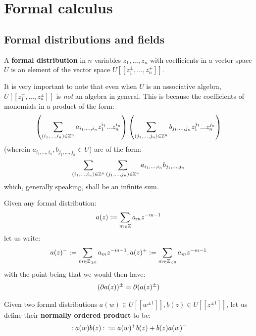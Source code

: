 \section{Formal calculus}
    \subsection{Formal distributions and fields}
        \begin{definition} \label{def: formal_distributions}
            A \textbf{formal distribution} in $n$ variables $z_1, ..., z_n$ with coefficients in a vector space $U$ is an element of the vector space $U[\![z_1^{\pm}, ..., z_n^{\pm}]\!]$.
        \end{definition}
        It is very important to note that even when $U$ is an associative algebra, $U[\![z_1^{\pm}, ..., z_n^{\pm}]\!]$ is \textit{not} an algebra in general. This is because the coefficients of monomials in a product of the form:
            $$\left( \sum_{(i_1, ..., i_n) \in \mathbb{Z}^n} a_{i_1, ..., i_n} z_1^{i_1} ... z_n^{i_n} \right) \left( \sum_{(j_1, ..., j_n) \in \mathbb{Z}^n} b_{j_1, ..., j_n} z_1^{j_1} ... z_n^{j_n} \right)$$
        (wherein $a_{i_1, ..., i_n}, b_{j_1, ..., j_n} \in U$) are of the form:
            $$\sum_{(i_1, ..., i_n) \in \mathbb{Z}^n} \sum_{(j_1, ..., j_n) \in \mathbb{Z}^n} a_{i_1, ..., i_n} b_{j_1, ..., j_n}$$
        which, generally speaking, shall be an infinite sum.

        \begin{convention}
            Given any formal distribution:
                $$a(z) := \sum_{m \in \mathbb{Z}} a_m z^{-m - 1}$$
            let us write:
                $$a(z)^- := \sum_{m \in \mathbb{Z}_{\geqslant 0}} a_m z^{-m - 1}, a(z)^+ := \sum_{m \in \mathbb{Z}_{< 0}} a_m z^{-m - 1}$$
            with the point being that we would then have:
                $$(\partial a(z))^{\pm} = \partial( a(z)^{\pm} )$$
        \end{convention}
        \begin{definition}[Fields]
            
        \end{definition}
        \begin{definition} \label{def: normal_ordering}
            Given two formal distributions $a(w) \in U[\![w^{\pm 1}]\!], b(z) \in U[\![z^{\pm 1}]\!]$, let us define their \textbf{normally ordered product} to be:
                $$\: \mathbf{:} \: { a(w) b(z) }  \: \mathbf{:} \: := a(w)^+ b(z) + b(z) a(w)^-$$
        \end{definition}

